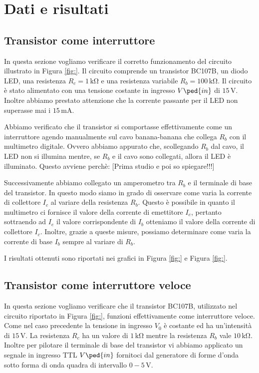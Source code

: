 \section*{Dati e risultati}

\subsection{Transistor come interruttore}

In questa sezione vogliamo verificare il corretto funzionamento del circuito illustrato in Figura \ref{fig:}.
Il circuito comprende un transistor BC107B, un diodo LED, una resistenza $R_c=1\,\si{\kilo\ohm}$ e una resistenza variabile $R_b=100\,\si{\kilo\ohm}$. Il circuito è stato alimentato con una tensione costante in ingresso $V\ped{in}$ di $15\,\si{\volt}$. Inoltre abbiamo prestato attenzione che la corrente passante per il LED non superasse mai i $15\,\si{\milli\ampere}$.

Abbiamo verificato che il transistor si comportasse effettivamente come un interruttore agendo manualmente sul cavo banana-banana che collega $R_b$ con il multimetro digitale. Ovvero abbiamo appurato che, scollegando $R_b$ dal cavo, il LED non si illumina mentre, se $R_b$ e il cavo sono collegati, allora il LED è illuminato. Questo avviene perchè: [Prima studio e poi so spiegare!!!]

Successivamente abbiamo collegato un amperometro tra $R_b$ e il terminale di base del transistor. In questo modo siamo in grado di osservare come varia la corrente di collettore $I_c$ al variare della resistenza $R_b$. Questo è possibile in quanto il multimetro ci fornisce il valore della corrente di emettitore $I_e$, pertanto sottraendo ad $I_e$ il valore corrispondente di $I_b$ otteniamo il valore della corrente di collettore $I_c$. Inoltre, grazie a queste misure, possiamo determinare come varia la corrente di base $I_b$ sempre al variare di $R_b$.

I risultati ottenuti sono riportati nei grafici in Figura \ref{fig:} e Figura \ref{fig:}.

\subsection{Transistor come interruttore veloce}

In questa sezione vogliamo verificare che il transistor BC107B, utilizzato nel circuito riportato in Figura \ref{fig:}, funzioni effettivamente come interruttore veloce.
Come nel caso precedente la tensione in ingresso $V_0$ è costante ed ha un'intensità di $15\,\si{\volt}$. La resistenza $R_c$ ha un valore di $1\,\si{\kilo\ohm}$ mentre la resistenza $R_b$ vale $10\,\si{\kilo\ohm}$. Inoltre per pilotare il terminale di base del transistor vi abbiamo applicato un segnale in ingresso TTL $V\ped{in}$ fornitoci dal generatore di forme d'onda sotto forma di onda quadra di intervallo $0-5\,\si{\volt}$.

